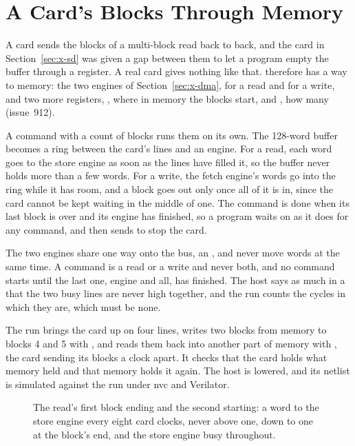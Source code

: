 \section{A Card's Blocks Through Memory}
\label{sec:x-sddma}

A card sends the blocks of a multi-block read back to back, and the
card in Section~\ref{sec:x-sd} was given a gap between them to let a
program empty the buffer through a register. A real card gives
nothing like that.  therefore has a way to memory: the two
engines of Section~\ref{sec:x-dma},  for a read and
 for a write, and two more registers, , where
in memory the blocks start, and , how many (issue~912).

A command with a count of blocks runs them on its own. The 128-word
buffer becomes a ring between the card's lines and an engine. For a
read, each word goes to the store engine as soon as the lines have
filled it, so the buffer never holds more than a few words. For a
write, the fetch engine's words go into the ring while it has room,
and a block goes out only once all of it is in, since the card cannot
be kept waiting in the middle of one. The command is done when its
last block is over and its engine has finished, so a program waits on
 as it does for any command, and then sends 
to stop the card.

The two engines share one way onto the bus, an , and
never move words at the same time. A command is a read or a write and
never both, and no command starts until the last one, engine and all,
has finished. The host says as much in a  that the two
busy lines are never high together, and the run counts the cycles in
which they are, which must be none.

The run brings the card up on four lines, writes two blocks from
memory to blocks 4 and 5 with , and reads them back into
another part of memory with , the card sending its blocks
a clock apart. It checks that the card holds what memory held and that
memory holds it again. The host is lowered, and its netlist is
simulated against the run under nvc and Verilator.

\begin{figure}[htbp]
\centering

\caption{The read's first block ending and the second starting: a
word to the store engine every eight card clocks,  never
above one,  down to one at the block's end, and the store
engine busy throughout.}
\label{fig:x-sddma}
\end{figure}





